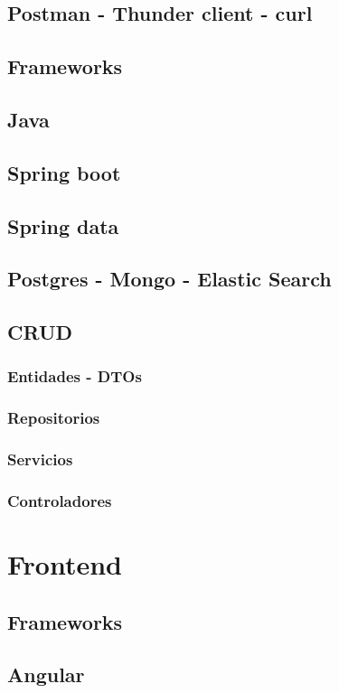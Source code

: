 \subsection{Postman - Thunder client - curl}
\subsection{Frameworks}
\subsection{Java}
\subsection{Spring boot}
\subsection{Spring data}
\subsection{Postgres - Mongo - Elastic Search}
\subsection{CRUD}
\subsubsection{Entidades - DTOs}
\subsubsection{Repositorios}
\subsubsection{Servicios}
\subsubsection{Controladores}

\section{Frontend}
\subsection{Frameworks}
\subsection{Angular}
